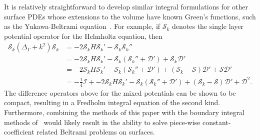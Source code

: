 \documentclass[11pt]{article}
\newcommand{\surflap}{\Delta_\Gamma}
\newcommand{\cI}{\mathcal I}
\newcommand{\cS}{\mathcal S}
\newcommand{\cD}{\mathcal D}
\numberwithin{equation}{section}
\begin{document}
It is relatively straightforward to develop
similar integral formulations for other surface PDEs whose extensions
to the volume have known Green's functions, such as the
Yukawa-Beltrami equation~\cite{kropinski_2016_integral}.
For example, if $\cS_k$ denotes the single layer potential operator
for the Helmholtz equation, then
\begin{equation}
  \begin{aligned}
    \cS_k \left( \surflap + k^2 \right) \cS_k &=
    -2\cS_k  H \cS_k' - \cS_k \cS_k'' \\
    &= -2\cS_k  H \cS_k' - \cS_k \left( \cS_k'' + \cD' \right) +
    \cS_k\cD' \\
    &= -2\cS_k  H \cS_k' - \cS_k \left( \cS_k'' + \cD' \right) +
      \left( \cS_k - \cS \right) \cD' + \cS\cD' \\
      &= -\frac{1}{4}\cI + -2\cS_k  H \cS_k' -
      \cS_k \left( \cS_k'' + \cD' \right) +
      \left( \cS_k - \cS \right) \cD' + \cD^2.
  \end{aligned}
\end{equation}
The difference operators above for the mixed potentials can be shown
to be compact, resulting in a Fredholm integral equation of the second
kind.
Furthermore, combining the methods of this paper with the boundary
integral methods of~\cite{kropinski_2016_integral,kropinski_2014_fast}
would likely result in the ability to solve piece-wise
constant-coefficient related Beltrami problems on surfaces.
 
\end{document}
